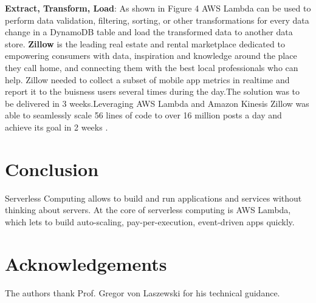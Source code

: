 \documentclass[9pt,twocolumn,twoside]{styles/osajnl}
\begin{document}
\begin{figure}[H]
\centering
\graphicspath{ {images/} }
\caption{} \cite{www-AWSLambda}
\label{fig:false-color}
\end{figure}

\textbf{Extract, Transform, Load}: As shown in Figure 4 AWS Lambda can be used to perform data validation, filtering, sorting, or other transformations for every data change in a DynamoDB table and load the transformed data to another data store. \textbf{Zillow} is the leading real estate and rental marketplace dedicated to empowering consumers with data, inspiration and knowledge around the place they call home, and connecting them with the best local professionals who can help. Zillow needed to collect a subset of mobile app metrics in realtime and report it to the buisness users several times during the day.The solution was to be delivered in 3 weeks.Leveraging AWS Lambda and Amazon Kinesis Zillow was able to seamlessly scale 56 lines of code to over 16 million posts a day and achieve its goal in 2 weeks \cite{www-AWSLambdaZillow}.


\section{Conclusion}
Serverless Computing allows to build and run applications and services without thinking about servers. At the core of serverless computing is AWS Lambda, which lets to build auto-scaling, pay-per-execution, event-driven apps quickly.

\section*{Acknowledgements}

The authors thank Prof. Gregor von Laszewski for his technical guidance.


\end{document}
